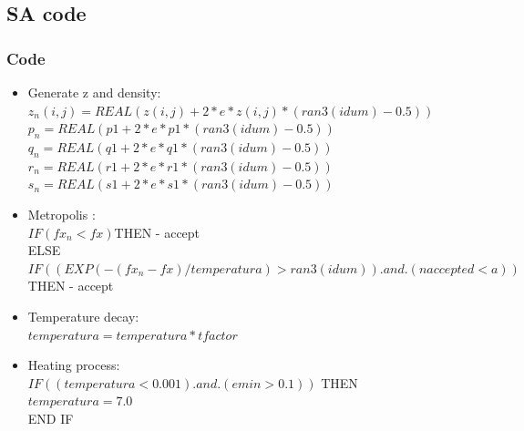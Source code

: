 \documentclass{beamer}
\begin{document}
\subsection{SA code} %

\begin{frame}
\frametitle{Code}
\begin{itemize}
\item Generate z and density: \\
$z_n(i,j) = REAL(z(i,j) + 2*e*z(i,j)*(ran3(idum) - 0.5)) $ \\
$p_n = REAL(p1 + 2*e*p1*(ran3(idum) - 0.5))$
$q_n = REAL(q1 + 2*e*q1*(ran3(idum) - 0.5))$
$r_n = REAL(r1 + 2*e*r1*(ran3(idum) - 0.5))  $
$s_n = REAL(s1 + 2*e*s1*(ran3(idum) - 0.5)) $
\item Metropolis : \\
$IF (fx_n < fx) $THEN - accept \\
ELSE  $IF ((EXP(-(fx_n - fx)/temperatura) > ran3(idum)) .and. (naccepted < a)  )$ THEN - accept \\
\item Temperature decay:\\
$temperatura = temperatura * tfactor$\\
\item Heating process:\\
$IF ((temperatura < 0.001).and.(emin > 0.1)) $ THEN \\
$temperatura = 7.0$ \\
END IF
\end{itemize}
\end{frame}

\end{document}
